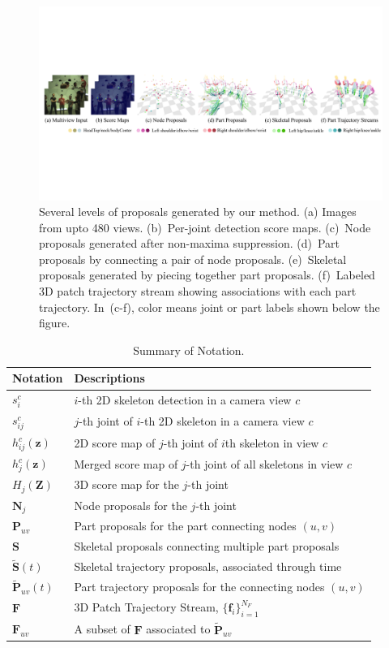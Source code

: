 \begin{figure}[t!]
	\includegraphics[width=\linewidth]{figures/overview2}
	\caption{Several levels of proposals generated by our method. (a) Images from upto 480 views. (b)~Per-joint detection score maps. (c)~Node proposals generated after non-maxima suppression. (d)~Part proposals by connecting a pair of node proposals. (e)~Skeletal  proposals generated by piecing together part proposals. (f)~Labeled 3D patch trajectory stream showing associations with each part trajectory. In~(c-f), color means joint or part labels shown below the figure.} 
	\label{fig:overview_mocap}
\end{figure}

\begin{table}[t]	
	\renewcommand{\arraystretch}{1.3}
	\caption{Summary of Notation.}
	\label{Table:notations}
	\centering
	\begin{tabular}{l|l}
		\hline 
		Notation & Descriptions \tabularnewline
		\hline 	
		$s_{i}^c $ & $i$-th 2D skeleton detection in a camera view $c$ \tabularnewline		
		\hline 
		$s_{ij}^c $ & $j$-th joint of $i$-th 2D skeleton in a camera view $c$  \tabularnewline		
		\hline 
		$h_{ij}^{c}(\mathbf{z})$ & 2D score map of $j$-th joint of $i$th skeleton in view $c$  \tabularnewline		
		\hline 
		$h_{j}^{c}(\mathbf{z}) $ & Merged score map of $j$-th joint of all skeletons in view $c$  \tabularnewline		
		\hline 
		${H}_{j}(\mathbf{Z})$ & 3D score map for the $j$-th joint \tabularnewline		
		\hline 
		$\mathbf{N}_j$ & Node proposals for the $j$-th joint\tabularnewline		
		\hline 
		$\mathbf{P}_{uv}$ & Part proposals for the part connecting nodes $(u,v)$ \tabularnewline		
		\hline 
		$\mathbf{S}$ & Skeletal proposals connecting multiple part proposals \tabularnewline		
		\hline 
		$\mathbf{\tilde{S}}(t)$ & Skeletal trajectory proposals, associated through time  \tabularnewline		
		\hline   
		$\mathbf{\tilde{P}}_{uv}(t)$ & Part trajectory proposals for the connecting nodes $(u,v)$ \tabularnewline		
		\hline 
		$\mathbf{F}$	& 3D Patch Trajectory Stream, $\{\mathbf{f}_i\}_{i=1}^{N_F}$  \tabularnewline		
		\hline   
		$\mathbf{F}_{uv}$	& A subset of  $\mathbf{F}$ associated to $\mathbf{\tilde{P}}_{uv}$ \tabularnewline		
		\hline   
	\end{tabular} 
\end{table}




